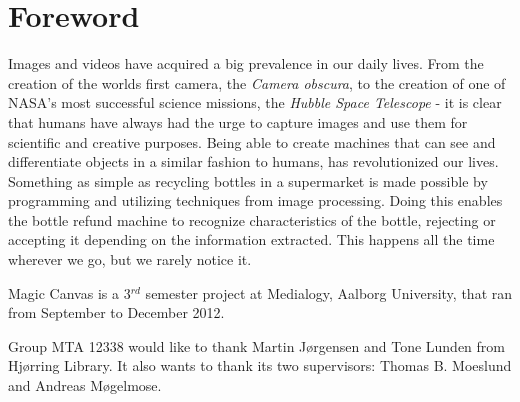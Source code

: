 \chapter*{Foreword}
Images and videos have acquired a big prevalence in our daily lives. From the creation of the worlds first camera, the \textit{Camera obscura}, to the creation of one of NASA's most successful science missions, the \textit{Hubble Space Telescope} - it is clear that humans have always had the urge to capture images and use them for scientific and creative purposes. Being able to create machines that can see and differentiate objects in a similar fashion to humans, has revolutionized our lives. Something as simple as recycling bottles in a supermarket is made possible by programming and utilizing techniques from image processing. Doing this enables the bottle refund machine to recognize characteristics of the bottle, rejecting or accepting it depending on the information extracted. This happens all the time wherever we go, but we rarely notice it.

Magic Canvas is a 3$^{rd}$ semester project at Medialogy, Aalborg University, that ran from September to December 2012.

Group MTA 12338 would like to thank Martin J{\o}rgensen and Tone Lunden from Hj{\o}rring Library. It also wants to thank its two supervisors: Thomas B. Moeslund and Andreas M{\o}gelmose.